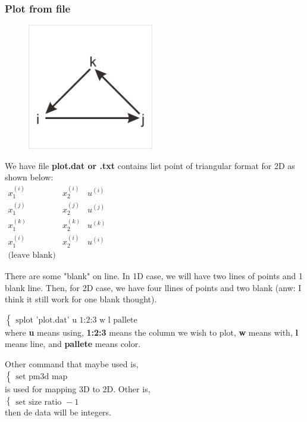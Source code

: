 \documentclass[a4paper,10pt]{article}
\begin{document}
\newpage
\subsubsection{Plot from file}
\begin{figure}
	\includegraphics[width=5.5cm]{"picture/triangular format"}
	\caption{}
	\label{fig:triangular-format}
\end{figure}

We have file \textbf{plot.dat or .txt} contains list point of triangular format for 2D as shown below:\\
$ \begin{matrix}
	x^{(i)}_{1} & x^{(i)}_{2} & u^{(i)} \\
	x^{(j)}_{1} & x^{(j)}_{2} & u^{(j)} \\
	x^{(k)}_{1} & x^{(k)}_{2} & u^{(k)} \\
	x^{(i)}_{1} & x^{(i)}_{2} & u^{(i)} \\
	\text{(leave blank)}
\end{matrix} $

There are some "blank" on line. In 1D case, we will have two lines of points and 1 blank line. Then, for 2D case, we have four llines of points and two blank (anw: I think it still work for one blank thought).

$ \begin{cases}
\text{splot 'plot.dat' u 1:2:3 w l pallete}
\end{cases} $ \\
where \textbf{u} means using, \textbf{1:2:3} means the column we wish to plot, \textbf{w} means with, \textbf{l} means line, and \textbf{pallete} means color.

Other command that maybe used is,\\
$ \begin{cases}
\text{set pm3d map}
\end{cases} $\\
is used for mapping 3D to 2D. Other is,\\
$ \begin{cases}
\text{set size ratio } -1
\end{cases} $\\
then de data will be integers.
\end{document}
